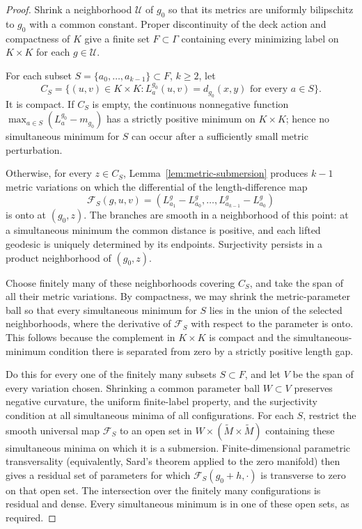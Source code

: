 \begin{proof}
Shrink a neighborhood $\mathcal U$ of $g_0$
so that its metrics are uniformly bilipschitz
to $g_0$ with a common constant. Proper
discontinuity of the deck action and compactness
of $K$ give a finite set $F\subset\Gamma$
containing every minimizing label on $K\times K$
for each $g\in\mathcal U$.

For each subset $S=\{a_0,\ldots,a_{k-1}\}
\subset F$, $k\geq2$, let
\[
 C_S=\{(u,v)\in K\times K:
  L_a^{g_0}(u,v)=d_{g_0}(x,y)
                    \text{ for every }a\in S\}.
\]
It is compact. If $C_S$ is empty, the
continuous nonnegative function
$\max_{a\in S}(L_a^{g_0}-m_{g_0})$
has a strictly positive minimum on
$K\times K$; hence no simultaneous
minimum for $S$ can occur after a
sufficiently small metric perturbation.

Otherwise, for every $z\in C_S$,
Lemma~\ref{lem:metric-submersion}
produces $k-1$ metric variations on
which the differential of the
length-difference map
\[
 \mathcal F_S(g,u,v)
 =(L_{a_1}^g-L_{a_0}^g,\ldots,
   L_{a_{k-1}}^g-L_{a_0}^g)
\]
is onto at $(g_0,z)$. The branches are
smooth in a neighborhood of this point:
at a simultaneous minimum the common
distance is positive, and each lifted
geodesic is uniquely determined by
its endpoints. Surjectivity persists
in a product neighborhood of $(g_0,z)$.

Choose finitely many of these neighborhoods
covering $C_S$, and take the span of all
their metric variations. By compactness,
we may shrink the metric-parameter ball
so that every simultaneous minimum for
$S$ lies in the union of the selected
neighborhoods, where the derivative of
$\mathcal F_S$ with respect to the parameter
is onto. This follows because the
complement in $K\times K$ is compact
and the simultaneous-minimum condition
there is separated from zero by a
strictly positive length gap.

Do this for every one of the finitely
many subsets $S\subset F$, and let $V$
be the span of every variation chosen.
Shrinking a common parameter ball
$W\subset V$ preserves negative
curvature, the uniform finite-label
property, and the surjectivity condition
at all simultaneous minima of all
configurations. For each $S$, restrict
the smooth universal map $\mathcal F_S$
to an open set in $W\times
(\widetilde M\times\widetilde M)$
containing these simultaneous minima
on which it is a submersion.
Finite-dimensional parametric
transversality (equivalently, Sard's
theorem applied to the zero manifold)
then gives a residual set of parameters
for which $\mathcal F_S(g_0+h,\cdot)$
is transverse to zero on that open set.
The intersection over the finitely
many configurations is residual and
dense. Every simultaneous minimum is
in one of these open sets, as required.
\end{proof}

